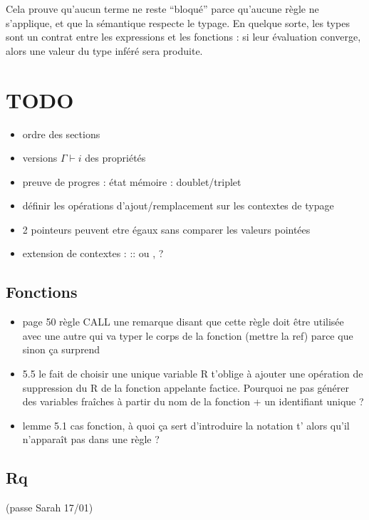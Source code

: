 Cela prouve qu'aucun terme ne reste ``bloqué'' parce qu'aucune règle ne
s'applique, et que la sémantique respecte le typage. En quelque sorte, les types
sont un contrat entre les expressions et les fonctions : si leur évaluation
converge, alors une valeur du type inféré sera produite.

\section*{TODO}

\begin{itemize}
\item ordre des sections
\item versions $Γ ⊢ i$ des propriétés
\item preuve de progres : état mémoire : doublet/triplet
\item définir les opérations d'ajout/remplacement sur les contextes de typage
\item 2 pointeurs peuvent etre égaux sans comparer les valeurs pointées
\item extension de contextes : :: ou , ?
\end{itemize}

\subsection*{Fonctions}

\begin{itemize}
\item
  page 50 règle CALL une remarque disant que cette règle doit être
  utilisée avec une autre qui va typer le corps de la fonction (mettre
  la ref) parce que sinon ça surprend
\item
  5.5 le fait de choisir une unique variable R t'oblige à ajouter une
  opération de suppression du R de la fonction appelante factice.
  Pourquoi ne pas générer des variables fraîches à partir du nom de la
  fonction + un identifiant unique ?
\item
  lemme 5.1 cas fonction, à quoi ça sert d'introduire la notation t'
  alors qu'il n'apparaît pas dans une règle ?
\end{itemize}

\subsection*{Rq}
(passe Sarah 17/01)

